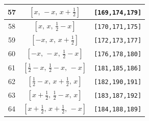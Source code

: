 \documentclass[fleqn,8pt]{jsarticle}
\begin{document}
\begin{longtable}{ccc}
57 & $\left[ x,\, - x,\, x + \frac{1}{2} \right]$ & {\tt [169,174,179]} \\ \hline
58 & $\left[ x,\, x,\, \frac{1}{2} - x \right]$ & {\tt [170,171,175]} \\ \hline
59 & $\left[ - x,\, x,\, x + \frac{1}{2} \right]$ & {\tt [172,173,177]} \\ \hline
60 & $\left[ - x,\, - x,\, \frac{1}{2} - x \right]$ & {\tt [176,178,180]} \\ \hline
61 & $\left[ \frac{1}{2} - x,\, \frac{1}{2} - x,\, - x \right]$ & {\tt [181,185,186]} \\ \hline
62 & $\left[ \frac{1}{2} - x,\, x + \frac{1}{2},\, x \right]$ & {\tt [182,190,191]} \\ \hline
63 & $\left[ x + \frac{1}{2},\, \frac{1}{2} - x,\, x \right]$ & {\tt [183,187,192]} \\ \hline
64 & $\left[ x + \frac{1}{2},\, x + \frac{1}{2},\, - x \right]$ & {\tt [184,188,189]} \\
\end{longtable}
\renewcommand{\arraystretch}{1.2}
\end{document}
